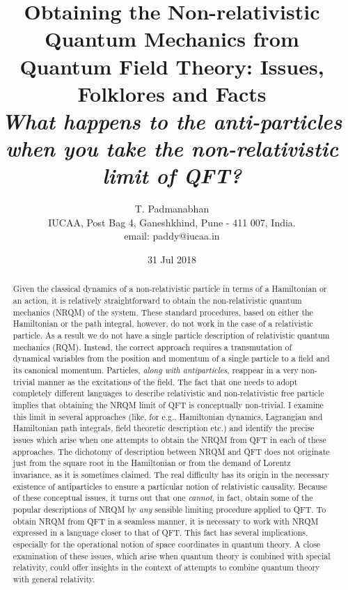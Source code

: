 \documentclass[12pt]{article}
\title{Obtaining the Non-relativistic Quantum Mechanics from Quantum Field Theory: Issues, Folklores and Facts\\
\vskip 1.1cm
{\textit{\Large What happens to the anti-particles when you take the non-relativistic limit of QFT?\\
\vskip 2cm
}}}
\author{T. Padmanabhan\\
IUCAA, Post Bag 4, Ganeshkhind,
 Pune - 411 007, India.\\
email: paddy@iucaa.in}
\date{31 Jul 2018}
\begin{document}
\maketitle



\begin{abstract}
 Given the classical dynamics of a non-relativistic particle in terms of a Hamiltonian or an action, it is relatively straightforward to obtain the non-relativistic quantum mechanics (NRQM) of the system. These standard procedures, based on either the Hamiltonian or the path integral, however, do not work in the case of a relativistic particle. As a result we do not have a single particle description of relativistic quantum mechanics (RQM). Instead, the correct approach requires a transmutation of dynamical variables from the position and momentum of a  single particle to a field and its canonical momentum. Particles, \textit{along with antiparticles},  reappear in a very non-trivial manner as the excitations of the field. The fact that one needs to adopt  completely different languages to describe  relativistic and non-relativistic free particle implies that obtaining the NRQM limit of QFT is conceptually non-trivial. I examine this limit in several approaches (like, for e.g., Hamiltonian dynamics, Lagrangian and Hamiltonian path integrals, field theoretic description etc.) and identify the precise issues which arise when one attempts to obtain the NRQM from QFT in each of these approaches. The dichotomy of description between NRQM and QFT  does not originate just  from the square root in the Hamiltonian or from the demand of Lorentz invariance, as it is sometimes claimed. The real difficulty has its origin in the necessary existence of antiparticles to ensure a particular notion of relativistic causality. Because of these conceptual issues, it turns out that one \textit{cannot}, in fact,  obtain  some of the popular descriptions of NRQM by \textit{any} sensible limiting procedure applied to QFT. To obtain NRQM from QFT in a  seamless manner, it is necessary to 
 work with NRQM expressed in a language  closer to that of QFT. This fact has several implications, especially for the operational notion of space coordinates in quantum theory. A close examination of these issues, which arise when quantum theory is combined with  special relativity,  could offer insights in the context of attempts to combine quantum theory with general relativity.  
\end{abstract}

\tableofcontents
\end{document}
